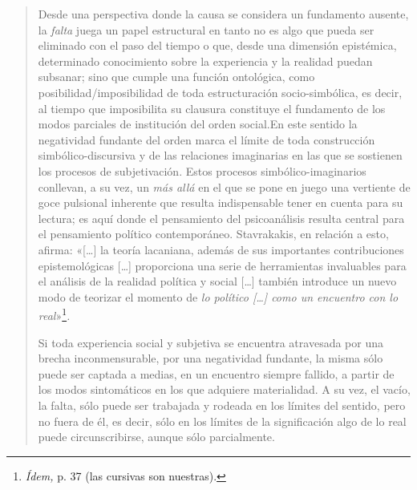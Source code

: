 \begin{quote}
Desde una perspectiva donde la causa se considera un fundamento ausente, la \emph{falta} juega un papel estructural en tanto no es algo que pueda ser eliminado con el paso del tiempo o que, desde una dimensión epistémica, determinado conocimiento sobre la experiencia y la realidad puedan subsanar; sino que cumple una función ontológica, como posibilidad/imposibilidad de toda estructuración socio-simbólica, es decir, al tiempo que imposibilita su clausura constituye el fundamento de los modos parciales de institución del orden social.En este sentido la negatividad fundante del orden marca el límite de toda construcción simbólico-discursiva y de las relaciones imaginarias en las que se sostienen los procesos de subjetivación. Estos procesos simbólico-imaginarios conllevan, a su vez, un \emph{más allá} en el que se pone en juego una vertiente de goce pulsional inherente que resulta indispensable tener en cuenta para su lectura; es aquí donde el pensamiento del psicoanálisis resulta central para el pensamiento político contemporáneo. Stavrakakis, en relación a esto, afirma: «{[}\ldots{]} la teoría lacaniana, además de sus importantes contribuciones epistemológicas {[}\ldots{]} proporciona una serie de herramientas invaluables para el análisis de la realidad política y social {[}\ldots{]} también introduce un nuevo modo de teorizar el momento de \emph{lo político {[}\ldots{]} como un encuentro con lo real}»\footnote{\emph{Ídem,} p. 37 (las cursivas son nuestras).}\emph{.}

Si toda experiencia social y subjetiva se encuentra atravesada por una brecha inconmensurable, por una negatividad fundante, la misma sólo puede ser captada a medias, en un encuentro siempre fallido, a partir de los modos sintomáticos en los que adquiere materialidad. A su vez, el vacío, la falta, sólo puede ser trabajada y rodeada en los límites del sentido, pero no fuera de él, es decir, sólo en los límites de la significación algo de lo real puede circunscribirse, aunque sólo parcialmente.


\end{quote}
